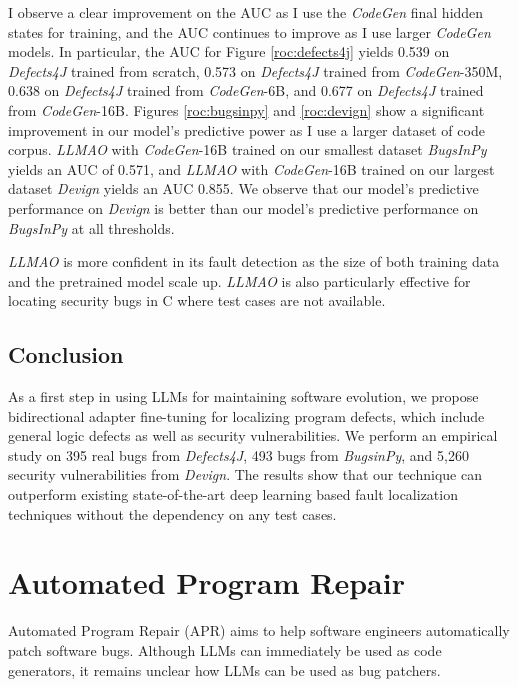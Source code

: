 \documentclass[12pt,openany,oneside,table]{cmuthesis}
\begin{document}
I observe a clear improvement on the AUC as I use the \textit{CodeGen} final hidden states for training, and the AUC continues to improve as I use larger \textit{CodeGen} models. 
In particular, the AUC for Figure \ref{roc:defects4j} yields 0.539 on \textit{Defects4J} trained from scratch, 0.573 on \textit{Defects4J} trained from \textit{CodeGen}-350M, 0.638 on \textit{Defects4J} trained from \textit{CodeGen}-6B, and 0.677 on \textit{Defects4J} trained from \textit{CodeGen}-16B.
Figures \ref{roc:bugsinpy} and \ref{roc:devign} show a significant improvement in our model's predictive power as I use a larger dataset of code corpus. \textit{LLMAO} with \textit{CodeGen}-16B trained on our smallest dataset \textit{BugsInPy} yields an AUC of 0.571, and \textit{LLMAO} with \textit{CodeGen}-16B trained on our largest dataset \textit{Devign} yields an AUC 0.855. We observe that our model's predictive performance on \textit{Devign} is better than our model's predictive performance on \textit{BugsInPy} at all thresholds.

    \begin{tcolorbox}
    [colback=white,colframe=black,arc=0pt,boxrule=0.5pt,title=RQ4 Summary,boxsep=2pt,left=1pt,right=1pt,top=1pt,bottom=1pt,fonttitle=\bfseries]
    \textit{LLMAO} is more confident in its fault detection as the size of both training data and the pretrained model scale up. \textit{LLMAO} is also particularly effective for locating security bugs in C where test cases are not available.

    \vspace{0.5em}
    \end{tcolorbox}

\section{Conclusion}
\label{sec:LLMAO-conclusion}
As a first step in using LLMs for maintaining software evolution, we propose bidirectional adapter fine-tuning for localizing program defects, which include general logic defects as well as security vulnerabilities. We perform an empirical study on 395 real bugs from \textit{Defects4J}, 493 bugs from \textit{BugsinPy}, and 5,260 security vulnerabilities from \textit{Devign}. The results show that our technique can outperform existing state-of-the-art deep learning based fault localization techniques without the dependency on any test cases.

\chapter{Automated Program Repair}
\label{ch:entropy}
Automated Program Repair (APR) aims to help software engineers automatically patch software bugs. Although LLMs can immediately be used as code generators, it remains unclear how LLMs can be used as bug patchers.
\end{document}
